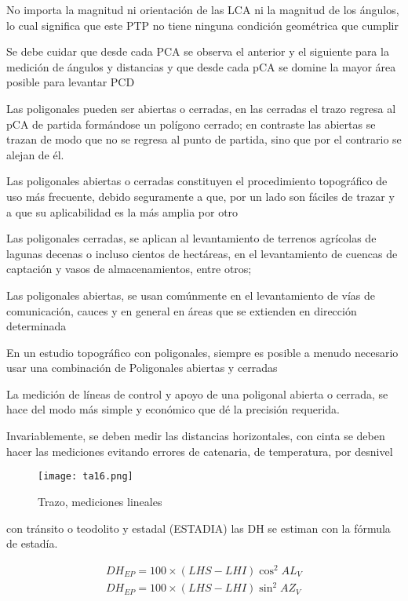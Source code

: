 No importa la magnitud ni orientación de las LCA ni la magnitud de los ángulos, lo cual significa que este PTP no tiene ninguna condición geométrica que cumplir

Se debe cuidar que desde cada PCA se observa el anterior y el siguiente para la medición de ángulos y distancias y que desde cada pCA se domine la mayor área posible para levantar PCD

Las poligonales pueden ser abiertas o cerradas, en las cerradas el trazo regresa al pCA de partida formándose un polígono cerrado; en contraste las abiertas se trazan de modo que no se regresa al punto de partida, sino que por el contrario se alejan de él.

Las poligonales abiertas o cerradas constituyen el procedimiento topográfico de uso más frecuente, debido seguramente a que, por un lado son fáciles de trazar y a que su aplicabilidad es la más amplia por otro

Las poligonales cerradas, se aplican al levantamiento de terrenos agrícolas de lagunas decenas o incluso cientos de hectáreas, en el levantamiento de cuencas de captación y vasos de almacenamientos, entre otros;

Las poligonales abiertas, se usan comúnmente en el levantamiento de vías de comunicación, cauces y en general en áreas que se extienden en dirección determinada

En un estudio topográfico con poligonales, siempre es posible a menudo necesario usar una combinación de Poligonales abiertas y cerradas

La medición de líneas de control y apoyo de una poligonal abierta o cerrada, se hace del modo más simple y económico que dé la precisión requerida.

Invariablemente, se deben medir las distancias horizontales, con cinta se deben hacer las mediciones evitando errores de catenaria, de temperatura, por desnivel

\begin{figure}[h!]
  \centerline{\texttt{[image: ta16.png]}}
  \caption{Trazo, mediciones lineales}
  \label{ta16}
\end{figure}

con tránsito o teodolito y estadal (ESTADIA) las DH se estiman con la fórmula de estadía.

\begin{align}
    DH_{EP}=100\times \left(LHS-LHI\right)\cos^2{AL_V}\\
    DH_{EP}=100\times \left(LHS-LHI\right)\sin^2{AZ_V}
\end{align}

